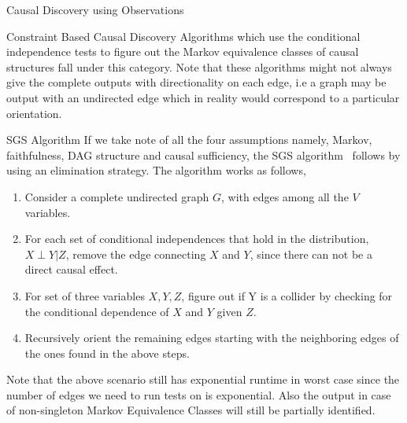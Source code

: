 \documentclass[10pt]{article}
\begin{document}
\begin{psection}[3]{Causal Discovery using Observations}

    \begin{psubsection}{Constraint Based Causal Discovery}
        Algorithms which use the conditional independence tests to figure out the Markov
        equivalence classes of causal structures fall under this category. Note that
        these algorithms might not always give the complete outputs with directionality
        on each edge, i.e a graph may be output with an undirected edge which in reality
        would correspond to a particular orientation. 

        \begin{pssubsection}{SGS Algorithm}
            If we take note of all the four assumptions namely, Markov, faithfulness,
            DAG structure and causal sufficiency, the SGS
            algorithm~\cite{spirtes2000causation} follows by using an elimination
            strategy. The algorithm works as follows,
            \begin{enumerate}
                \item Consider a complete undirected graph $G$, with edges among all the
                    $V$ variables. 
                \item For each set of conditional independences that hold in the
                    distribution, $X \perp Y \vert Z$, remove the edge connecting  $X$
                    and $Y$, since there can not be a direct causal effect. 
                \item For set of three variables $X, Y, Z$, figure out if Y is a
                    collider by checking for the conditional dependence of $X$ and $Y$
                    given $Z$. 
                \item Recursively orient the remaining edges starting with the
                    neighboring edges of the ones found in the above steps. 
            \end{enumerate} 
            Note that the above scenario still has exponential runtime in worst case
            since the number of edges we need to run tests on is exponential. Also the
            output in case of non-singleton Markov Equivalence Classes will still be
            partially identified. 
        \end{pssubsection}


\end{psubsection}
\end{psection}
\end{document}
